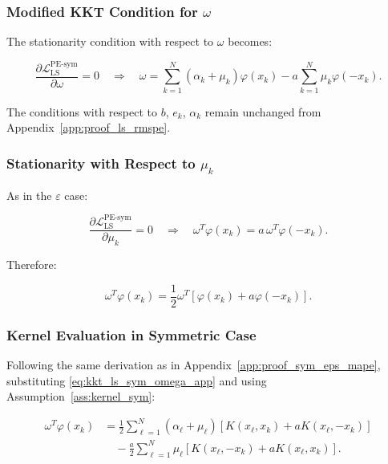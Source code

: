 \documentclass[mathematics,article,submit,pdftex,moreauthors]{Definitions/mdpi}
\begin{document}
\subsubsection{Modified KKT Condition for $\omega$}

The stationarity condition with respect to $\omega$ becomes:
\begin{linenomath}
\begin{equation}\label{eq:kkt_ls_sym_omega_app}
\frac{\partial\mathcal{L}_{\mathrm{LS}}^{\mathrm{PE\text{-}sym}}}{\partial\omega} = 0 
\quad \Rightarrow \quad 
\omega = \sum_{k=1}^N (\alpha_k + \mu_k)\varphi(x_k) - a\sum_{k=1}^N \mu_k\varphi(-x_k).
\end{equation}
\end{linenomath}

The conditions with respect to $b$, $e_k$, $\alpha_k$ remain unchanged from Appendix~\ref{app:proof_ls_rmspe}.

\subsubsection{Stationarity with Respect to $\mu_k$}

As in the $\varepsilon$ case:
\begin{linenomath}
\begin{equation}
\frac{\partial\mathcal{L}_{\mathrm{LS}}^{\mathrm{PE\text{-}sym}}}{\partial\mu_k} = 0 
\quad \Rightarrow \quad 
\omega^T\varphi(x_k) = a\,\omega^T\varphi(-x_k).
\end{equation}
\end{linenomath}

Therefore:
\begin{linenomath}
\begin{equation}
\omega^T\varphi(x_k) = \frac{1}{2}\omega^T[\varphi(x_k) + a\varphi(-x_k)].
\end{equation}
\end{linenomath}

\subsubsection{Kernel Evaluation in Symmetric Case}

Following the same derivation as in Appendix~\ref{app:proof_sym_eps_mape}, 
substituting \eqref{eq:kkt_ls_sym_omega_app} and using Assumption~\ref{ass:kernel_sym}:
\begin{linenomath}
\begin{equation}
\begin{aligned}
\omega^T\varphi(x_k) 
&= \frac{1}{2}\sum_{\ell=1}^N (\alpha_\ell + \mu_\ell)[K(x_\ell, x_k) + aK(x_\ell, -x_k)]\\
&\quad - \frac{a}{2}\sum_{\ell=1}^N \mu_\ell[K(x_\ell, -x_k) + aK(x_\ell, x_k)].
\end{aligned}
\end{equation}
\end{linenomath}
\end{document}
